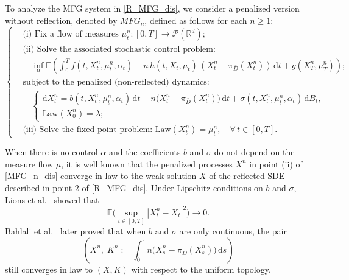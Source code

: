 \documentclass[11pt,amsfonts]{article}
\theoremstyle{plain}
\theoremstyle{assumpstyle}
\numberwithin{equation}{section}
\numberwithin{theorem}{section}
\numberwithin{proposition}{section}
\numberwithin{definition}{section}
\numberwithin{remark}{section}
\numberwithin{corollary}{section}
\numberwithin{lemma}{section}
\begin{document}
To analyze the MFG system in \eqref{R_MFG_dis}, we consider a penalized version without reflection, denoted by $MFG_n$, defined as follows for each $n \geq 1$:
\begin{equation} \label{MFG_n_dis}
\left\{
\begin{aligned}
&\text{(i) Fix a flow of measures } 
\mu_t^n: [0, T] \to \mathcal{P}(\mathbb{R}^d); \\[1ex]
&\text{(ii) Solve the associated stochastic control problem:} \\[1ex]
&\quad 
\inf_{\alpha} \mathbb{E} \left(
    \int_0^T 
        f(t, X_t^n, \mu_t^n, \alpha_t)
        + n\, h(t, X_t, \mu_t)\, (X_t^n - \pi_{\bar{D}}(X_t^n))
    \, \mathrm{d}t 
    + g(X_T^n, \mu_T^n)
\right); \\[1ex]
&\text{subject to the penalized (non-reflected) dynamics:} \\[1ex]
&\quad
\begin{cases}
\mathrm{d}X_t^n = b(t, X_t^n, \mu_t^n, \alpha_t)\, \mathrm{d}t 
- n\big(X_t^n - \pi_{\bar{D}}(X_t^n)\big)\, \mathrm{d}t 
+ \sigma(t, X_t^n, \mu_t^n, \alpha_t)\, \mathrm{d}B_t, \\[0.5ex]
\text{Law}(X_0^n) = \lambda;
\end{cases} \\[2ex]
&\text{(iii) Solve the fixed-point problem: } 
\text{Law}(X_t^n) = \mu_t^n, \quad \forall\, t \in [0, T].
\end{aligned}
\right.
\end{equation}

When there is no control $ \alpha $ and the coefficients $ b $ and $ \sigma $ do not depend on the measure flow $ \mu $, it is well known that the penalized processes $ X^n $ in point (ii) of \eqref{MFG_n_dis} converge in law to the weak solution $ X $ of the reflected SDE described in point 2 of \eqref{R_MFG_dis}. Under Lipschitz conditions on $ b $ and $ \sigma $, Lions et al.~\cite{Lion-no-cont} showed that
\begin{equation*}
\mathbb{E}\Big( \sup_{t \in [0,T]} |X_t^n - X_t|^2 \Big) \to 0.
\end{equation*}
Bahlali et al.~\cite{bahlali-PDE} later proved that when $ b $ and $\sigma$ are only continuous, the pair
\begin{equation*}
\left(X^n,\; K^n := \int_0^\cdot n\big(X_s^n - \pi_{\bar{D}}(X_s^n)\big)\,\mathrm{d}s\right)
\end{equation*}
still converges in law to $ (X, K) $ with respect to the uniform topology.
\end{document}
